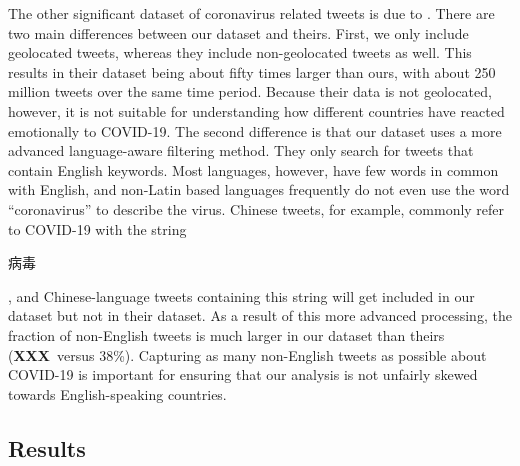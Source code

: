\documentclass[11pt]{article}
\newcommand{\XXX}{{\color{red}\textbf{XXX}}~}
\newcommand{\bertmoji}{\texttt{BERTmoticon}}
\DeclareMathOperator{\emoticon}{\texttt{TwitterEmoticon}}
\DeclareMathOperator{\corona}{\texttt{TwitterCOVID}}
\begin{document}
The other significant dataset of coronavirus related tweets is due to \citet{chen2020tracking}.
There are two main differences between our dataset and theirs.
First, we only include geolocated tweets,
whereas they include non-geolocated tweets as well.
This results in their dataset being about fifty times larger than ours,
with about 250 million tweets over the same time period.
Because their data is not geolocated, however, it is not suitable for understanding how different countries have reacted emotionally to COVID-19.
The second difference is that our dataset uses a more advanced language-aware filtering method.
They only search for tweets that contain English keywords.
Most languages, however, have few words in common with English,
and non-Latin based languages frequently do not even use the word ``coronavirus'' to describe the virus.
Chinese tweets, for example, commonly refer to COVID-19 with the string
\begin{CJK}{UTF8}{gbsn}
病毒
\end{CJK},
and Chinese-language tweets containing this string will get included in our dataset but not in their dataset.
As a result of this more advanced processing, the fraction of non-English tweets is much larger in our dataset than theirs (\XXX versus 38\%).
Capturing as many non-English tweets as possible about COVID-19 is important for ensuring that our analysis is not unfairly skewed towards English-speaking countries.



\subsection{Results}
\end{document}
